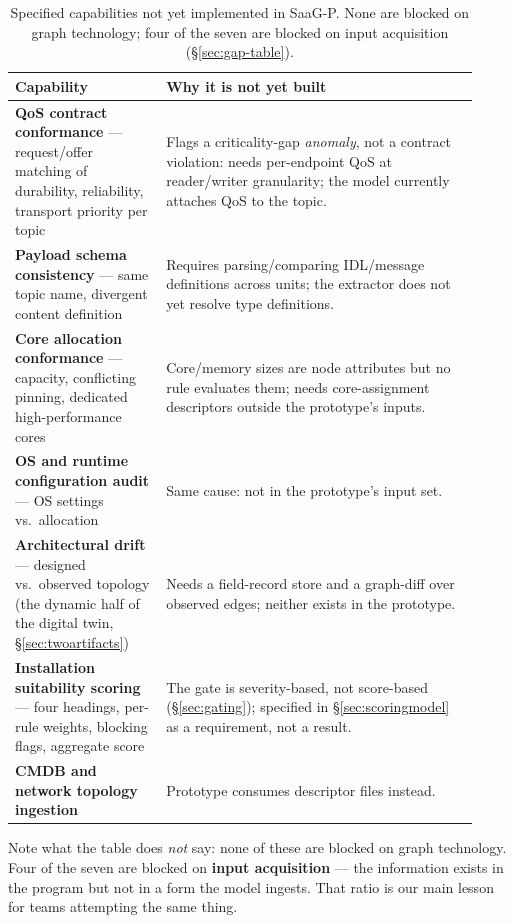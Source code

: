 \documentclass[sigconf,9pt]{acmart}
\begin{document}
\begin{table}[t]
\caption{Specified capabilities not yet implemented in SaaG-P. None are blocked on graph
technology; four of the seven are blocked on input acquisition (\S\ref{sec:gap-table}).}
\label{tab:gaptable}
\footnotesize
\begin{tabular}{@{}p{0.30\linewidth}p{0.62\linewidth}@{}}
\toprule
\textbf{Capability} & \textbf{Why it is not yet built} \\
\midrule
\textbf{QoS contract conformance} --- request/offer matching of durability, reliability, transport
priority per topic &
Flags a criticality-gap \emph{anomaly}, not a contract violation: needs per-endpoint QoS at
reader/writer granularity; the model currently attaches QoS to the topic. \\
\textbf{Payload schema consistency} --- same topic name, divergent content definition &
Requires parsing/comparing IDL/message definitions across units; the extractor does not yet
resolve type definitions. \\
\textbf{Core allocation conformance} --- capacity, conflicting pinning, dedicated high-performance
cores &
Core/memory sizes are node attributes but no rule evaluates them; needs core-assignment
descriptors outside the prototype's inputs. \\
\textbf{OS and runtime configuration audit} --- OS settings vs.\ allocation &
Same cause: not in the prototype's input set. \\
\textbf{Architectural drift} --- designed vs.\ observed topology (the dynamic half of the digital
twin, \S\ref{sec:twoartifacts}) &
Needs a field-record store and a graph-diff over observed edges; neither exists in the prototype. \\
\textbf{Installation suitability scoring} --- four headings, per-rule weights, blocking flags,
aggregate score &
The gate is severity-based, not score-based (\S\ref{sec:gating}); specified in
\S\ref{sec:scoringmodel} as a requirement, not a result. \\
\textbf{CMDB and network topology ingestion} &
Prototype consumes descriptor files instead. \\
\bottomrule
\end{tabular}
\end{table}

Note what the table does \emph{not} say: none of these are blocked on graph technology. Four of the
seven are blocked on \textbf{input acquisition} --- the information exists in the program but not in
a form the model ingests. That ratio is our main lesson for teams attempting the same thing.
\end{document}
